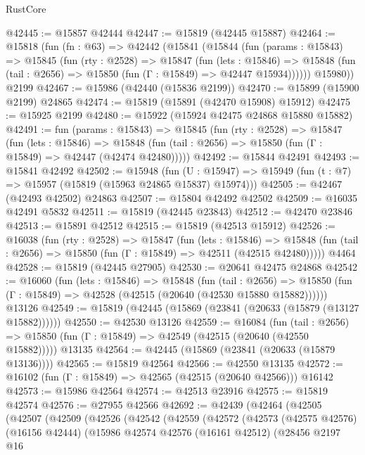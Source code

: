 \begin{lexlean}{RustCore}
\begin{coremodule}
@42445 := @15857 @42444
@42447 := @15819 (@42445 @15887)
@42464 := @15818
    (fun (fn : @63) =>
    @42442
      (@15841
        (@15844
          (fun (params : @15843) =>
          @15845
            (fun (rty : @2528) =>
            @15847
              (fun (lets : @15846) =>
              @15848 (fun (tail : @2656) => @15850 (fun (Γ : @15849) => @42447 @15934))))))
        @15980))
    @2199
@42467 := @15986 (@42440 (@15836 @2199))
@42470 := @15899 (@15900 @2199) @24865
@42474 := @15819 (@15891 (@42470 @15908) @15912)
@42475 := @15925 @2199
@42480 := @15922 (@15924 @42475 @24868 @15880 @15882)
@42491 := fun (params : @15843) =>
  @15845
    (fun (rty : @2528) =>
    @15847
      (fun (lets : @15846) =>
      @15848 (fun (tail : @2656) => @15850 (fun (Γ : @15849) => @42447 (@42474 @42480)))))
@42492 := @15844 @42491
@42493 := @15841 @42492
@42502 := @15948
    (fun (U : @15947) => @15949 (fun (t : @7) => @15957 (@15819 (@15963 @24865 @15837) @15974)))
@42505 := @42467 (@42493 @42502) @24863
@42507 := @15804 @42492 @42502
@42509 := @16035 @42491 @5832
@42511 := @15819 (@42445 @23843)
@42512 := @42470 @23846
@42513 := @15891 @42512
@42515 := @15819 (@42513 @15912)
@42526 := @16038
    (fun (rty : @2528) =>
    @15847
      (fun (lets : @15846) =>
      @15848 (fun (tail : @2656) => @15850 (fun (Γ : @15849) => @42511 (@42515 @42480)))))
    @4464
@42528 := @15819 (@42445 @27905)
@42530 := @20641 @42475 @24868
@42542 := @16060
    (fun (lets : @15846) =>
    @15848
      (fun (tail : @2656) =>
      @15850 (fun (Γ : @15849) => @42528 (@42515 (@20640 (@42530 @15880 @15882))))))
    @13126
@42549 := @15819 (@42445 (@15869 (@23841 (@20633 (@15879 (@13127 @15882))))))
@42550 := @42530 @13126
@42559 := @16084
    (fun (tail : @2656) => @15850 (fun (Γ : @15849) => @42549 (@42515 (@20640 (@42550 @15882)))))
    @13135
@42564 := @42445 (@15869 (@23841 (@20633 (@15879 @13136))))
@42565 := @15819 @42564
@42566 := @42550 @13135
@42572 := @16102 (fun (Γ : @15849) => @42565 (@42515 (@20640 @42566))) @16142
@42573 := @15986 @42564
@42574 := @42513 @23916
@42575 := @15819 @42574
@42576 := @27955 @42566
@42692 := @42439
    (@42464
      (@42505
        (@42507
          (@42509
            (@42526
              (@42542
                (@42559
                  (@42572
                    (@42573
                      (@42575 @42576)
                      (@16156 @42444)
                      (@15986
                        @42574
                        @42576
                        (@16161 @42512)
                        (@28456
                          @2197
                          @16

\end{coremodule}
\end{lexlean}

